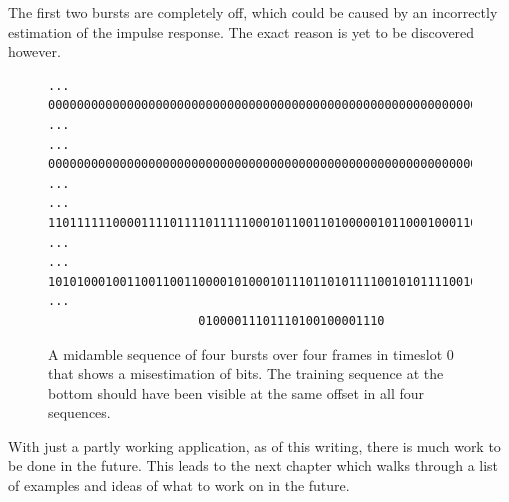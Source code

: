 The first two bursts are completely off, which could be caused by an
incorrectly estimation of the impulse response. The exact reason is
yet to be discovered however.

\begin{figure}[H]
  \centering
  \begin{BVerbatim}
... 000000000000000000000000000000000000000000000000000000000000 ...
... 000000000000000000000000000000000000000000000000000000000000 ...
... 110111111000011110111101111100010110011010000010110001000110 ...
... 101010001001100110011000010100010111011010111100101011110010 ...
                     01000011101110100100001110
  \end{BVerbatim}
  \caption{A midamble sequence of four bursts over four frames in
    timeslot $0$ that shows a misestimation of bits. The training
    sequence at the bottom should have been visible at the same offset
    in all four sequences.}
  \label{fig:bad_estimation}
\end{figure}

With just a partly working application, as of this writing, there is much
work to be done in the future. This leads to the next chapter which
walks through a list of examples and ideas of what to work on in the
future.
